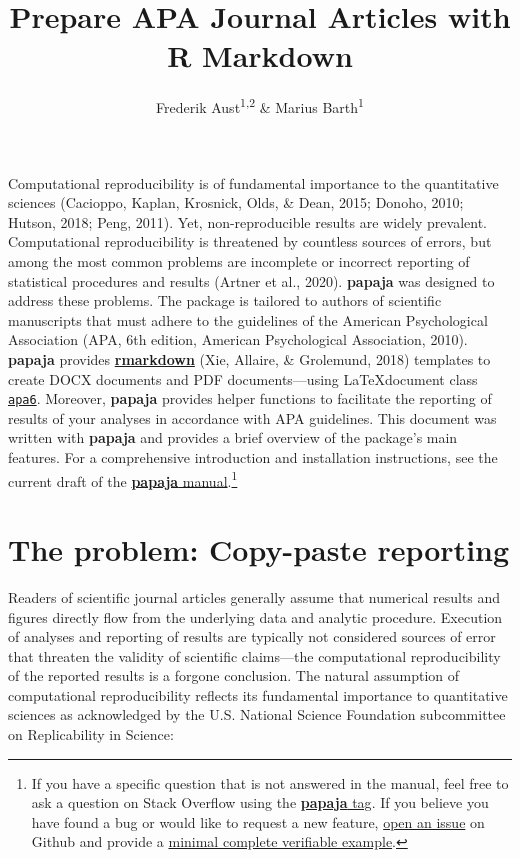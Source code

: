 \documentclass[
  english,
  ,man,floatsintext]{apa6}
\title{Prepare APA Journal Articles with R Markdown}
\author{Frederik Aust\textsuperscript{1,2} \& Marius Barth\textsuperscript{1}}
\date{}
\affiliation{\vspace{0.5cm}\textsuperscript{1} University of Cologne\\\textsuperscript{2} University of Amsterdam}
\begin{document}
\maketitle



Computational reproducibility is of fundamental importance to the quantitative sciences (Cacioppo, Kaplan, Krosnick, Olds, \& Dean, 2015; Donoho, 2010; Hutson, 2018; Peng, 2011).
Yet, non-reproducible results are widely prevalent.
Computational reproducibility is threatened by countless sources of errors, but among the most common problems are incomplete or incorrect reporting of statistical procedures and results (Artner et al., 2020).
\textbf{papaja} was designed to address these problems.
The package is tailored to authors of scientific manuscripts that must adhere to the guidelines of the American Psychological Association (APA, 6th edition, American Psychological Association, 2010).
\textbf{papaja} provides \href{https://rmarkdown.rstudio.com/}{\textbf{rmarkdown}} (Xie, Allaire, \& Grolemund, 2018) templates to create DOCX documents and PDF documents---using \LaTeX document class \href{https://www.ctan.org/pkg/apa6}{\texttt{apa6}}.
Moreover, \textbf{papaja} provides helper functions to facilitate the reporting of results of your analyses in accordance with APA guidelines.
This document was written with \textbf{papaja} and provides a brief overview of the package's main features.
For a comprehensive introduction and installation instructions, see the current draft of the \href{https://frederikaust.com/papaja_man/}{\textbf{papaja} manual}.\footnote{If you have a specific question that is not answered in the manual, feel free to ask a question on Stack Overflow using the \href{https://stackoverflow.com/questions/tagged/papaja}{\textbf{papaja} tag}.
  If you believe you have found a bug or would like to request a new feature, \href{https://github.com/crsh/papaja/issues}{open an issue} on Github and provide a \href{https://stackoverflow.com/help/minimal-reproducible-example}{minimal complete verifiable example}.}

\section{The problem: Copy-paste reporting}\label{the-problem-copy-paste-reporting}

Readers of scientific journal articles generally assume that numerical results and figures directly flow from the underlying data and analytic procedure.
Execution of analyses and reporting of results are typically not considered sources of error that threaten the validity of scientific claims---the computational reproducibility of the reported results is a forgone conclusion.
The natural assumption of computational reproducibility reflects its fundamental importance to quantitative sciences as acknowledged by the U.S.
National Science Foundation subcommittee on Replicability in Science:
\end{document}
